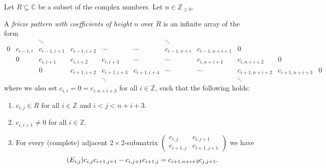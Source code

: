 \documentclass[ALCO,ThmDefs,Unicode,epreuves,published]{cedram}
\numberwithin{equation}{section}
\newcommand{\CC }{\mathbb{C}}
\begin{document}
\begin{defi} \label{def:frieze}
Let $R\subseteq\CC$ be a subset of the complex numbers.
Let $n\in \mathbb{Z}_{\ge 0}$.

A \emph{frieze pattern with coefficients of height $n$} over $R$ 
is an infinite array of the form
\[
\begin{array}{ccccccccccc}
 && \ddots  & & & &\ddots  & & \\
0 & c_{i-1,i} & c_{i-1,i+1} & c_{i-1,i+2} & \cdots & \cdots & c_{i-1,n+i} & c_{i-1,n+i+1} & 0 & & \\
& 0 & c_{i,i+1} & c_{i,i+2} & c_{i,i+3} & \cdots & \cdots & c_{i,n+i+1} & c_{i,n+i+2} & 0 & \\
& & 0 & c_{i+1,i+2} & c_{i+1,i+3} & c_{i+1,i+4} & \cdots & \cdots & c_{i+1,n+i+2} & c_{i+1,n+i+3} & 0 \\
 & & & & \ddots & & & &\ddots & 
\end{array}
\]
where we also set $c_{i,i}=0=c_{i,n+i+3}$ for all $i\in \mathbb{Z}$,
such that the following holds:
\begin{enumerate}[label=(\arabic*)]
 \item %
 $c_{i,j}\in R$ for all $i\in\mathbb{Z}$ and $i< j< n+i+3$.
 \item %
 $c_{i,i+1}\neq 0$ for all $i\in \mathbb{Z}$.
 \item %
 For every
(complete) adjacent $2\times 2$-submatrix $\begin{pmatrix} c_{i,j} & c_{i,j+1}\\
c_{i+1,j} & c_{i+1,j+1} \end{pmatrix}$ we have
\begin{equation*}\tag{$E_{i,j}$}\label{eq:local}
c_{i,j} c_{i+1,j+1} - c_{i,j+1}c_{i+1,j} = c_{i+1,n+i+3}c_{j,j+1}.
\end{equation*}
\end{enumerate}
\end{defi}
\end{document}
